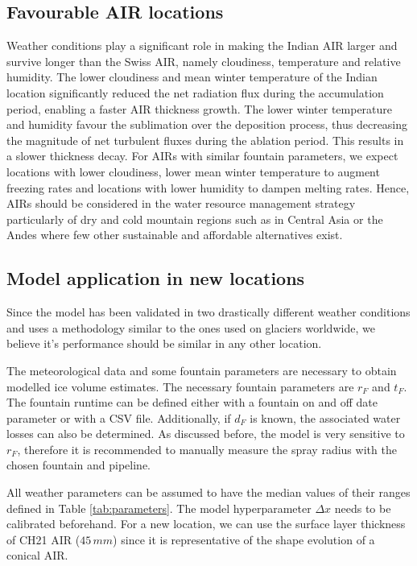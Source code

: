 \documentclass[utf8]{frontiersSCNS}
\begin{document}
\subsection{Favourable AIR locations}

Weather conditions play a significant role in making the Indian AIR larger and survive longer than the Swiss
AIR, namely cloudiness, temperature and relative humidity. The lower cloudiness and mean winter temperature of
the Indian location significantly reduced the net radiation flux during the accumulation period, enabling a
faster AIR thickness growth. The lower winter temperature and humidity favour the sublimation over the
deposition process, thus decreasing the magnitude of net turbulent fluxes during the ablation period. This
results in a slower thickness decay. For AIRs with similar fountain parameters, we expect locations with lower
cloudiness, lower mean winter temperature to augment freezing rates and locations with lower humidity to dampen
melting rates. Hence, AIRs should be considered in the water resource management strategy particularly of dry
and cold mountain regions such as in Central Asia or the Andes where few other sustainable and affordable
alternatives exist.

\subsection{Model application in new locations}

Since the model has been validated in two drastically different weather conditions and uses a methodology
similar to the ones used on glaciers worldwide, we believe it's performance should be similar in any other
location.  

The meteorological data and some fountain parameters are necessary to obtain modelled ice volume estimates. The
necessary fountain parameters are $r_F$ and $t_F$. The fountain runtime can be defined either with a fountain on
and off date parameter or with a CSV file. Additionally, if $d_F$ is known, the associated water losses can also
be determined. As discussed before, the model is very sensitive to $r_F$, therefore it is recommended to
manually measure the spray radius with the chosen fountain and pipeline.

All weather parameters can be assumed to have the median values of their ranges defined in Table
\ref{tab:parameters}. The model hyperparameter $\Delta x$ needs to be calibrated beforehand. For a new location,
we can use the surface layer thickness of CH21 AIR ($45\,mm$) since it is representative of the shape evolution
of a conical AIR.
\end{document}
